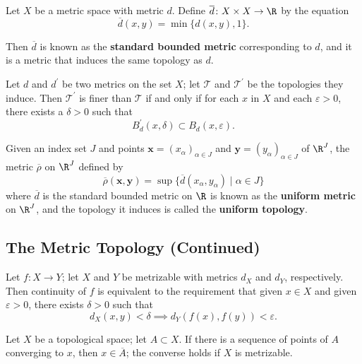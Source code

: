\begin{theorem}
Let $X$ be a metric space with metric $d$. Define $\overline{d} \colon X \times X \rightarrow \R$ by the equation
\[
    \overline{d} (x, y) = \min \{ d(x, y), 1 \}. 
\]

Then $\overline{d}$ is known as the \textbf{standard bounded metric} corresponding to $d$, and it is a metric that
induces the same topology as $d$.
\end{theorem}

\begin{lemma}
Let $d$ and $d^{\prime}$ be two metrics on the set $X$; let $\mathscr{T}$ and $\mathscr{T}^{\prime}$ be the topologies they induce.
Then $\mathscr{T}^{\prime}$ is finer than $\mathscr{T}$ if and only if for each $x$ in $X$ and each $\varepsilon > 0$, there exists a $\delta > 0$ such that
\[
    B_d^{\prime}(x, \delta) \subset B_d(x, \varepsilon).
\]
\end{lemma}

\begin{definition}
Given an index set $J$ and points $\mathbf{x} = (x_\alpha)_{\alpha \in J}$ and $\mathbf{y} = (y_\alpha)_{\alpha \in J}$ of $\R^J$, the metric $\overline{\rho}$ on $\R^J$ defined by
\[
    \overline{\rho}(\mathbf{x} , \mathbf{y}) = \sup \{ \overline{d}(x_\alpha, y_\alpha) \mid \alpha \in J \}  
\]
where $\overline{d}$ is the standard bounded metric on $\R$ is known as the \textbf{uniform metric} on $\R^J$, and
the topology it induces is called the \textbf{uniform topology}.
\end{definition}

\subsection{The Metric Topology (Continued)}

\begin{theorem}
Let $f \colon X \rightarrow Y$; let $X$ and $Y$ be metrizable with metrics $d_X$ and $d_Y$, respectively. Then continuity of $f$ is equivalent to the
requirement that given $x \in X$ and given $\varepsilon > 0$, there exists $\delta > 0$ such that
\[
    d_X(x, y) < \delta \implies d_Y(f(x), f(y)) < \varepsilon.
\]
\end{theorem}

\begin{lemma}
Let $X$ be a topological space; let $A \subset X$. If there is a sequence of points of $A$ converging to $x$, then $x \in \overline{A}$; the converse holds
if $X$ is metrizable.
\end{lemma}

